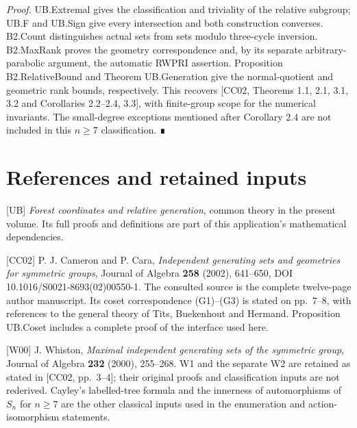 \emph{Proof.} UB.Extremal gives the classification and triviality of the relative subgroup; UB.F and UB.Sign give every intersection and both construction converses. B2.Count distinguishes actual sets from sets modulo three-cycle inversion. B2.MaxRank proves the geometry correspondence and, by its separate arbitrary-parabolic argument, the automatic RWPRI assertion. Proposition B2.RelativeBound and Theorem UB.Generation give the normal-quotient and geometric rank bounds, respectively. This recovers {[}CC02, Theorems 1.1, 2.1, 3.1, 3.2 and Corollaries 2.2--2.4, 3.3{]}, with finite-group scope for the numerical invariants. The small-degree exceptions mentioned after Corollary 2.4 are not included in this \(n\geq7\) classification. ∎

\section*{References and retained inputs}
{[}UB{]} \emph{Forest coordinates and relative generation}, common theory in the present volume. Its full proofs and definitions are part of this application's mathematical dependencies.

{[}CC02{]} P. J. Cameron and P. Cara, \emph{Independent generating sets and geometries for symmetric groups}, Journal of Algebra \textbf{258} (2002), 641--650, DOI 10.1016/S0021-8693(02)00550-1. The consulted source is the complete twelve-page author manuscript. Its coset correspondence (G1)--(G3) is stated on pp.~7--8, with references to the general theory of Tits, Buekenhout and Hermand. Proposition UB.Coset includes a complete proof of the interface used here.

{[}W00{]} J. Whiston, \emph{Maximal independent generating sets of the symmetric group}, Journal of Algebra \textbf{232} (2000), 255--268. W1 and the separate W2 are retained as stated in {[}CC02, pp.~3--4{]}; their original proofs and classification inputs are not rederived. Cayley's labelled-tree formula and the innerness of automorphisms of \(S_n\) for \(n\geq7\) are the other classical inputs used in the enumeration and action-isomorphism statements.


